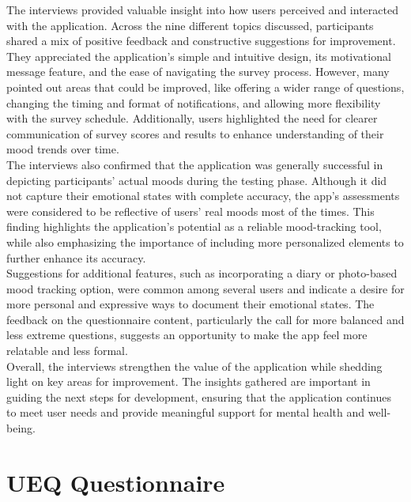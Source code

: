 The interviews provided valuable insight into how users perceived and interacted with the application. Across the nine different topics discussed, participants shared a mix of positive feedback and constructive suggestions for improvement. They appreciated the application's simple and intuitive design, its motivational message feature, and the ease of navigating the survey process. However, many pointed out areas that could be improved, like offering a wider range of questions, changing the timing and format of notifications, and allowing more flexibility with the survey schedule. Additionally, users highlighted the need for clearer communication of survey scores and results to enhance understanding of their mood trends over time.\vspace{5mm} \\
The interviews also confirmed that the application was generally successful in depicting participants’ actual moods during the testing phase. Although it did not capture their emotional states with complete accuracy, the app’s assessments were considered to be reflective of users' real moods  most of the times. This finding highlights the application’s potential as a reliable mood-tracking tool, while also emphasizing the importance of including more personalized elements to further enhance its accuracy.\vspace{5mm} \\
Suggestions for additional features, such as incorporating a diary or photo-based mood tracking option, were common among several users and indicate a desire for more personal and expressive ways to document their emotional states. The feedback on the questionnaire content, particularly the call for more balanced and less extreme questions, suggests an opportunity to make the app feel more relatable and less formal.\vspace{5mm} \\
Overall, the interviews strengthen the value of the application while shedding light on key areas for improvement. The insights gathered are important in guiding the next steps for development, ensuring that the application continues to meet user needs and provide meaningful support for mental health and well-being.

\section{UEQ Questionnaire}

